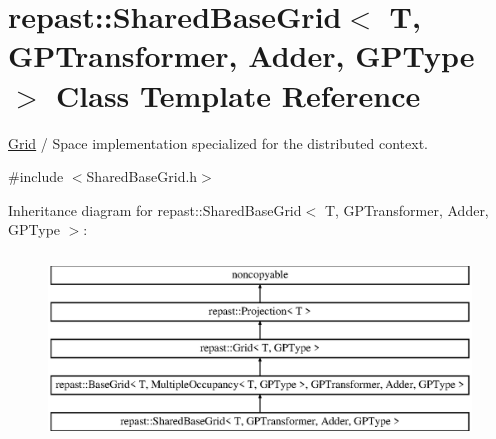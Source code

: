 \hypertarget{classrepast_1_1_shared_base_grid}{\section{repast\-:\-:Shared\-Base\-Grid$<$ T, G\-P\-Transformer, Adder, G\-P\-Type $>$ Class Template Reference}
\label{classrepast_1_1_shared_base_grid}
}


\hyperlink{classrepast_1_1_grid}{Grid} / Space implementation specialized for the distributed context.  




{\ttfamily \#include $<$Shared\-Base\-Grid.\-h$>$}

Inheritance diagram for repast\-:\-:Shared\-Base\-Grid$<$ T, G\-P\-Transformer, Adder, G\-P\-Type $>$\-:\begin{figure}[H]
\begin{center}
\leavevmode
\includegraphics[height=5.000000cm]{classrepast_1_1_shared_base_grid}
\end{center}
\end{figure}
